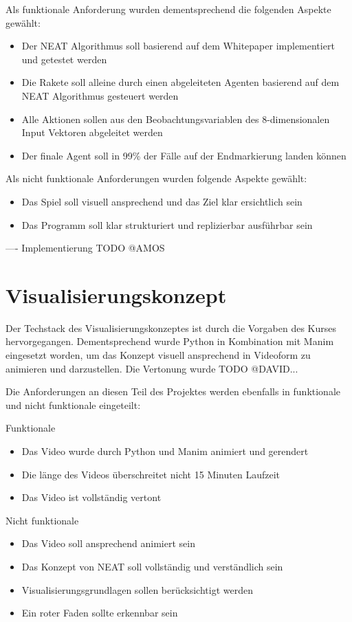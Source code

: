 Als funktionale Anforderung wurden dementsprechend die folgenden Aspekte gewählt:
\begin{itemize}
	\item Der NEAT Algorithmus soll basierend auf dem Whitepaper implementiert und getestet werden
	\item Die Rakete soll alleine durch einen abgeleiteten Agenten basierend auf dem NEAT Algorithmus gesteuert werden
	\item Alle Aktionen sollen aus den Beobachtungsvariablen des 8-dimensionalen Input Vektoren abgeleitet werden
	\item Der finale Agent soll in 99\% der Fälle auf der Endmarkierung landen können 
\end{itemize}

Als nicht funktionale Anforderungen wurden folgende Aspekte gewählt:
\begin{itemize}
	\item Das Spiel soll visuell ansprechend und das Ziel klar ersichtlich sein
	\item Das Programm soll klar strukturiert und replizierbar ausführbar sein
\end{itemize}


---- Implementierung  TODO @AMOS

\section{Visualisierungskonzept}

Der Techstack des Visualisierungskonzeptes ist durch die Vorgaben des Kurses hervorgegangen. Dementsprechend wurde Python in Kombination mit Manim eingesetzt worden, um das Konzept visuell ansprechend in Videoform zu animieren und darzustellen. Die Vertonung wurde TODO @DAVID...

Die Anforderungen an diesen Teil des Projektes werden ebenfalls in funktionale und nicht funktionale eingeteilt:  

Funktionale 
\begin{itemize}

	\item Das Video wurde durch Python und Manim animiert und gerendert 
	\item Die länge des Videos überschreitet nicht 15 Minuten Laufzeit
	\item Das Video ist vollständig vertont
	
\end{itemize}

Nicht funktionale
\begin{itemize}

	\item Das Video soll ansprechend animiert sein
	\item Das Konzept von NEAT soll vollständig und verständlich sein
	\item Visualisierungsgrundlagen sollen berücksichtigt werden
	\item Ein roter Faden sollte erkennbar sein

\end{itemize}


